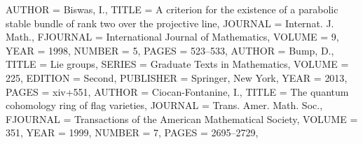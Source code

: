 \begin{bibdiv}
\begin{biblist}
 {
    AUTHOR = {Biswas, I.},
     TITLE = {A criterion for the existence of a parabolic stable bundle of
              rank two over the projective line},
   JOURNAL = {Internat. J. Math.},
  FJOURNAL = {International Journal of Mathematics},
    VOLUME = {9},
      YEAR = {1998},
    NUMBER = {5},
     PAGES = {523--533},
}
 {
    AUTHOR = {Bump, D.},
     TITLE = {Lie groups},
    SERIES = {Graduate Texts in Mathematics},
    VOLUME = {225},
   EDITION = {Second},
 PUBLISHER = {Springer, New York},
      YEAR = {2013},
     PAGES = {xiv+551},
}
 {
    AUTHOR = {Ciocan-Fontanine, I.},
     TITLE = {The quantum cohomology ring of flag varieties},
   JOURNAL = {Trans. Amer. Math. Soc.},
  FJOURNAL = {Transactions of the American Mathematical Society},
    VOLUME = {351},
      YEAR = {1999},
    NUMBER = {7},
     PAGES = {2695--2729},
}
\iffalse
{}
\end{biblist}
\end{bibdiv}
